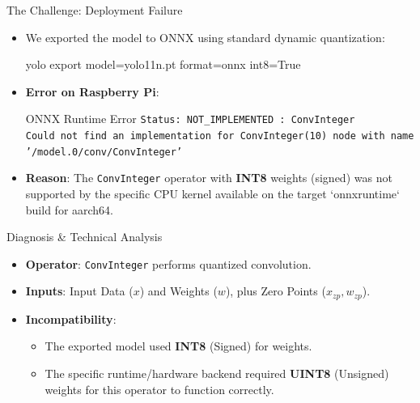 \documentclass{beamer}
\begin{document}
\begin{frame}{The Challenge: Deployment Failure}
    \begin{itemize}
        \item We exported the model to ONNX using standard dynamic quantization:
        \begin{code}
            yolo export model=yolo11n.pt format=onnx int8=True
        \end{code}
        \item \textbf{Error on Raspberry Pi}:
        \begin{alertblock}{ONNX Runtime Error}
            \texttt{Status: NOT\_IMPLEMENTED : ConvInteger} \\
            \texttt{Could not find an implementation for ConvInteger(10) node with name '/model.0/conv/ConvInteger'}
        \end{alertblock}
        \item \textbf{Reason}: The \texttt{ConvInteger} operator with \textbf{INT8} weights (signed) was not supported by the specific CPU kernel available on the target `onnxruntime` build for aarch64.
    \end{itemize}
\end{frame}

\begin{frame}{Diagnosis & Technical Analysis}
    \begin{itemize}
        \item \textbf{Operator}: \texttt{ConvInteger} performs quantized convolution.
        \item \textbf{Inputs}: Input Data ($x$) and Weights ($w$), plus Zero Points ($x_{zp}, w_{zp}$).
        \item \textbf{Incompatibility}:
        \begin{itemize}
            \item The exported model used \textbf{INT8} (Signed) for weights.
            \item The specific runtime/hardware backend required \textbf{UINT8} (Unsigned) weights for this operator to function correctly.
        \end{itemize}
    \end{itemize}
\end{frame}
\end{document}
